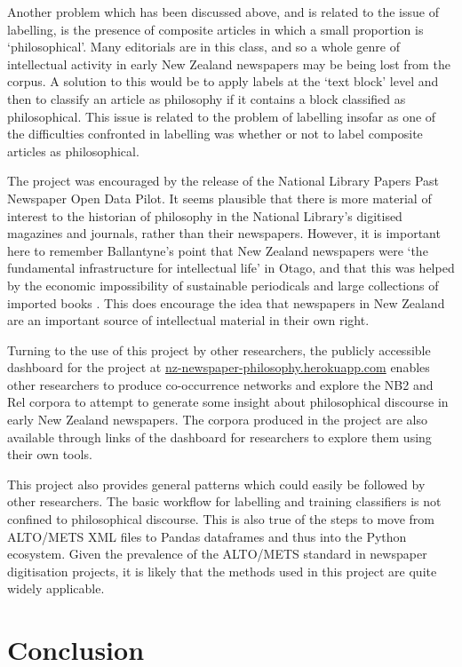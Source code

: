 \documentclass{article}
\begin{document}
Another problem which has been discussed above, and is related to the issue of labelling, is the presence of composite articles in which a small proportion is `philosophical'. Many editorials are in this class, and so a whole genre of intellectual activity in early New Zealand newspapers may be being lost from the corpus. A solution to this would be to apply labels at the `text block' level and then to classify an article as philosophy if it contains a block classified as philosophical. This issue is related to the problem of labelling insofar as one of the difficulties confronted in labelling was whether or not to label composite articles as philosophical.

The project was encouraged by the release of the National Library Papers Past Newspaper Open Data Pilot. It seems plausible that there is more material of interest to the historian of philosophy in the National Library's digitised magazines and journals, rather than their newspapers. However, it is important here to remember Ballantyne's point that New Zealand newspapers were `the fundamental infrastructure for intellectual life' in Otago, and that this was helped by the economic impossibility of sustainable periodicals and large collections of imported books \cite[57--58]{ballantyne-2012}. This does encourage the idea that newspapers in New Zealand are an important source of intellectual material in their own right.

Turning to the use of this project by other researchers, the publicly accessible dashboard for the project at \url{nz-newspaper-philosophy.herokuapp.com} enables other researchers to produce co-occurrence networks and explore the NB2 and Rel corpora to attempt to generate some insight about philosophical discourse in early New Zealand newspapers. The corpora produced in the project are also available through links of the dashboard for researchers to explore them using their own tools.

This project also provides general patterns which could easily be followed by other researchers. The basic workflow for labelling and training classifiers is not confined to philosophical discourse. This is also true of the steps to move from ALTO/METS XML files to Pandas dataframes and thus into the Python ecosystem. Given the prevalence of the ALTO/METS standard in newspaper digitisation projects, it is likely that the methods used in this project are quite widely applicable.

\section*{Conclusion}
\end{document}
